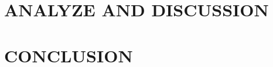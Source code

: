 \documentclass[3p,twocolumn,preprint]{elsarticle}
\begin{document}
\section{ANALYZE AND DISCUSSION}
\label{sec:ANALYZE AND DISCUSSION}

\section{CONCLUSION}
\label{sec:CONCLUSION}






% 
\end{document}
